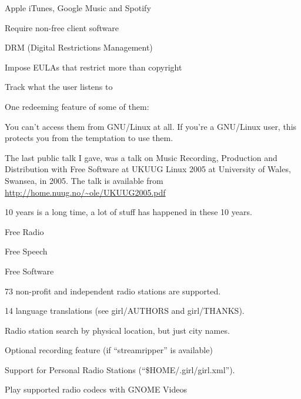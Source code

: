 \documentclass[20pt,landscape]{foils}
\begin{document}

\begin{list1}
\item Apple iTunes, Google Music and Spotify
  \begin{list2}
  \item Require non-free client software
  \item DRM (Digital Restrictions Management)
  \item Impose EULAs that restrict more than copyright
  \item Track what the user listens to
  \end{list2}
\end{list1}

One redeeming feature of some of them:

\begin{list2}
\item You can't access them from GNU/Linux at all.  If you're a GNU/Linux user, this protects you from the temptation to use them.
\end{list2}


The last public talk I gave, was a talk on Music Recording, Production and Distribution with Free Software at UKUUG Linux 2005 at University of Wales, Swansea, in 2005. The talk is available from \url{http://home.nuug.no/~ole/UKUUG2005.pdf}

10 years is a long time, a lot of stuff has happened in these 10 years.

\begin{list1}
\item Free Radio
\item Free Speech
\item Free Software
\end{list1}


\begin{list1}
\item 73 non-profit and independent radio stations are supported.
\item 14 language translations (see girl/AUTHORS and girl/THANKS).
\item Radio station search by physical location, but just city names.
\item Optional recording feature (if ``streamripper'' is available)
\item Support for Personal Radio Stations (``\$HOME/.girl/girl.xml'').
\item Play supported radio codecs with GNOME Videos
\end{list1}
\end{document}
